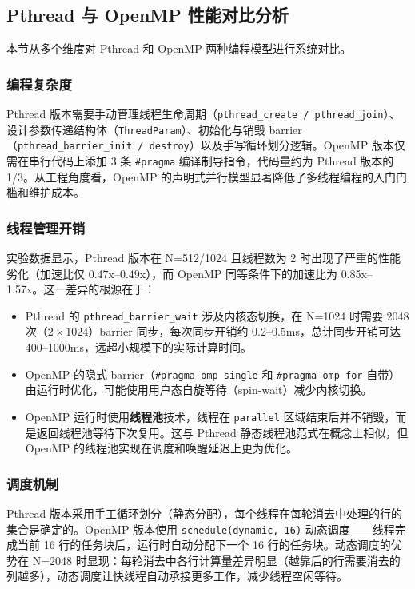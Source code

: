 \documentclass[a4paper]{article}
\begin{document}
\subsection{Pthread 与 OpenMP 性能对比分析}

本节从多个维度对 Pthread 和 OpenMP 两种编程模型进行系统对比。

\subsubsection{编程复杂度}

Pthread 版本需要手动管理线程生命周期（\texttt{pthread\_create / pthread\_join}）、设计参数传递结构体（\texttt{ThreadParam}）、初始化与销毁 barrier（\texttt{pthread\_barrier\_init / destroy}）以及手写循环划分逻辑。OpenMP 版本仅需在串行代码上添加 3 条 \texttt{\#pragma} 编译制导指令，代码量约为 Pthread 版本的 1/3。从工程角度看，OpenMP 的声明式并行模型显著降低了多线程编程的入门门槛和维护成本。

\subsubsection{线程管理开销}

实验数据显示，Pthread 版本在 N=512/1024 且线程数为 2 时出现了严重的性能劣化（加速比仅 0.47x--0.49x），而 OpenMP 同等条件下的加速比为 0.85x--1.57x。这一差异的根源在于：

\begin{itemize}
    \item Pthread 的 \texttt{pthread\_barrier\_wait} 涉及内核态切换，在 N=1024 时需要 2048 次（$2 \times 1024$）barrier 同步，每次同步开销约 0.2--0.5ms，总计同步开销可达 400--1000ms，远超小规模下的实际计算时间。
    \item OpenMP 的隐式 barrier（\texttt{\#pragma omp single} 和 \texttt{\#pragma omp for} 自带）由运行时优化，可能使用用户态自旋等待（spin-wait）减少内核切换。
    \item OpenMP 运行时使用\textbf{线程池}技术，线程在 \texttt{parallel} 区域结束后并不销毁，而是返回线程池等待下次复用。这与 Pthread 静态线程池范式在概念上相似，但 OpenMP 的线程池实现在调度和唤醒延迟上更为优化。
\end{itemize}

\subsubsection{调度机制}

Pthread 版本采用手工循环划分（静态分配），每个线程在每轮消去中处理的行的集合是确定的。OpenMP 版本使用 \texttt{schedule(dynamic, 16)} 动态调度——线程完成当前 16 行的任务块后，运行时自动分配下一个 16 行的任务块。动态调度的优势在 N=2048 时显现：每轮消去中各行计算量差异明显（越靠后的行需要消去的列越多），动态调度让快线程自动承接更多工作，减少线程空闲等待。
\end{document}
